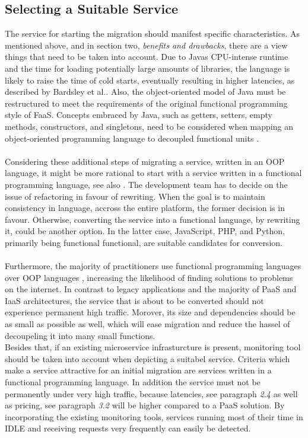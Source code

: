 \documentclass[a4paper,twoside,11pt, pagesize]{scrartcl}
\begin{document}
\begin{spacing}{1.2}
\subsection{Selecting a Suitable Service}The service for starting the migration should manifest specific characteristics. As mentioned above, and in section two, \textit{benefits and drawbacks}, there are a view things that need to be taken into account. Due to Javas CPU-intense runtime and the time for loading potentially large amounts of libraries, the language is likely to raise the time of cold starts, eventually resulting in higher latencies, as described by Bardsley et al.. Also, the object-oriented model of Java must be restructured to meet the requirements of the original functional programming style of FaaS. Concepts embraced by Java, such as getters, setters, empty methods, constructors, and singletons, need to be considered when mapping an object-oriented programming language to decoupled functional units \cite{bardsley2018serverless}.\\\\ Considering these additional steps of migrating a service, written in an OOP language, it might be more rational to start with a service written in a functional programming language, see also \cite{leitner2019mixed}. The development team has to decide on the issue of refactoring in favour of rewriting. When the goal is to maintain consistency in language, accross the entire platform, the former decision is in favour. Otherwise, converting the service into a functional language, by rewriting it, could be another option. In the latter case, JavaScript, PHP, and Python, primarily being functional functional, are suitable candidates for conversion.\\\\ Furthermore, the majority of practitioners use functional programming languages over OOP languages \cite{leitner2019mixed}, increasing the likelihood of finding solutions to problems on the internet. In contrast to legacy applications and the majority of PaaS and IaaS architectures, the service that is about to be converted should not experience permanent high traffic. Morover, its size and dependencies should be as small as possible as well, which will ease migration and reduce the hassel of decoupeling it into many small functions.\\Besides that, if an existing microservice infrasturcture is present, monitoring tool should be taken into account when depicting a suitabel service. Criteria which make a service attractive for an initial migration are services written in a functional programming language. In addition the service must not be permanently under very high traffic, because latencies, see paragraph \textit{2.4} as well as pricing, see paragraph \textit{3.2} will be higher compared to a PaaS solution. By incorporating the existing monitoring tools, services running most of their time in IDLE and receiving requests very frequently can easily be detected.

\end{spacing}
\end{document}
